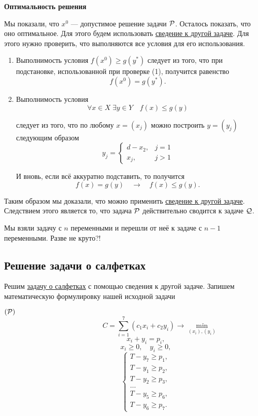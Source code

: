 \bigskip

\textbf{Оптимальность решения}

Мы показали, что $x^0$ --- допустимое решение задачи $\P$. Осталось показать, что оно оптимальное. Для этого будем использовать \hyperref[fact:reduction_to_other_problem]{сведение к другой задаче}. Для этого нужно проверить, что выполняются все условия для его использования.

\begin{enumerate}[nosep]
	\item Выполнимость условия $f(x^0) \ge g(y^*)$ следует из того, что при подстановке, использованной при проверке (1), получится равенство
	\[
	f(x^0) = g(y^*).
	\]
	
	\item Выполнимость условия
	\[
	\forall x \in X \; \exists y \in Y \quad f(x) \le g(y)
	\]
	
	следует из того, что по любому $x = (x_j)$ можно построить $y = (y_j)$ следующим образом
	\[
	y_j = \begin{cases}
		d - x_2,& j = 1 \\
		x_j,& j > 1
	\end{cases}
	\]
	
	И вновь, если всё аккуратно подставить, то получится
	\[
	f(x) = g(y) \quad \rightarrow \quad f(x) \le g(y).
	\]
\end{enumerate}

Таким образом мы доказали, что можно применить \hyperref[fact:reduction_to_other_problem]{сведение к другой задаче}. Следствием этого является то, что задача $\P$ действительно сводится к задаче $\Q$.

Мы взяли задачу с $n$ переменными и перешли от неё к задаче с $n-1$ переменными. Разве не круто?!

\subsection{Решение задачи о салфетках}


Решим \hyperref[pr:napkins]{задачу о салфетках} с помощью сведения к другой задаче. Запишем математическую формулировку нашей исходной задачи

$(\P) $
\[
\qquad\qquad\qquad\qquad C = \sum_{i=1}^7 (c_1 x_i + c_2 y_i) \to \min_{(x_i), (y_i)}
\]
\[
\qquad\qquad x_i + y_i = p_i,
\]
\[
\qquad\qquad x_i \ge 0, \quad y_i \ge 0,
\]
\[
\qquad\qquad\begin{cases}
	T - y_7 \ge p_1, \\
	T - y_1 \ge p_2, \\
	T - y_2 \ge p_3, \\
	\dots \\
	T - y_5 \ge p_6, \\
	T - y_6 \ge p_7.
\end{cases}
\]

